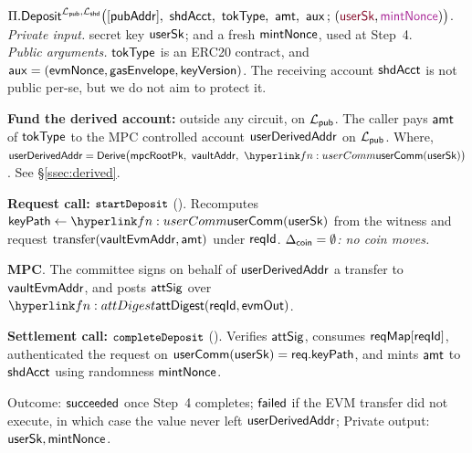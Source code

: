 \begin{ProcBox}{$\Pi.\Deposit^{\Lpub, \Lshd}\bigl([\pubAddr]\bc \shdAcct\bc \tokType\bc \amt\bc
      \auxx \,;\, (\secret{\usersk}, \freshrn{\mintNonce})\bigr)$.}
\sloppy
\emph{Private input.} secret key $\mathsf{userSk}$; and a fresh $\mathsf{mintNonce}$, used at Step~4.\\
\emph{Public arguments.} $\mathsf{tokType}$ is an ERC20 contract,
and $\mathsf{aux} = (\mathsf{evmNonce}, \mathsf{gasEnvelope}, \mathsf{keyVersion})$.
The receiving \zkswap{} account $\mathsf{shdAcct}$  is not public per-se, but we
do not aim to protect it.

\begin{Steps}
\item \textbf{Fund the derived account:} outside any circuit, on $\mathcal{L}_{\mathsf{pub}}$. The caller pays $\mathsf{amt}$ of $\mathsf{tokType}$  to  the MPC controlled account $\mathsf{userDerivedAddr}$ on $\mathcal{L}_{\mathsf{pub}}$. Where,
      $\derivedAddr = \Derive\bigl(\mpcRootPk\bc \vaultAddr\bc
      \lnk{fn:userComm}{\userComm(\usersk)}\bigr)$. See \S\ref{ssec:derived}.
\item \textbf{Request call: $\texttt{\small startDeposit}$} (). Recomputes
      $\keyPath \gets \lnk{fn:userComm}\userComm(\usersk)$ from the witness and request
      $\text{transfer}(\mathsf{vaultEvmAddr}, \mathsf{amt})$ under $\mathsf{reqId}$. \emph{$\Delta_{\mathsf{coin}} = \emptyset$: no coin
      moves.}
\item \textbf{MPC}. The committee signs on behalf of  $\mathsf{userDerivedAddr}$ a transfer to $\mathsf{vaultEvmAddr}$, and posts $\mathsf{attSig}$ over
      $\lnk{fn:attDigest}{\attDigest(\rid, \evmOut)}$.
\item \textbf{Settlement call: $\texttt{\small completeDeposit}$} (). Verifies
      $\mathsf{attSig}$, consumes $\mathsf{reqMap}[\mathsf{reqId}]$, authenticated the request on $\mathsf{userComm}(\mathsf{userSk}) = \mathsf{req}.\mathsf{keyPath}$, and mints
      $\mathsf{amt}$ to $\mathsf{shdAcct}$ using randomness $\mathsf{mintNonce}$.
\end{Steps}

\medskip
Outcome: $\mathsf{succeeded}$ once Step~4 completes; $\mathsf{failed}$ if the EVM transfer did not execute, in which
case the value never left $\mathsf{userDerivedAddr}$;
Private output: $\mathsf{userSk},\mathsf{mintNonce}$.
\end{ProcBox}


